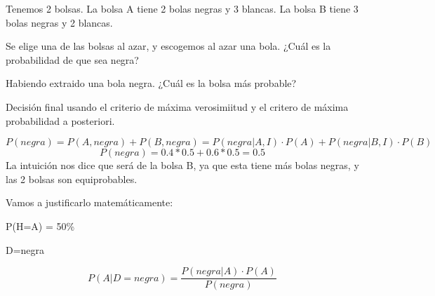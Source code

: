 \begin{problem}[4]
Tenemos 2 bolsas. La bolsa A tiene 2 bolas negras y 3 blancas. La bolsa B tiene 3 bolas negras y 2 blancas.

\ppart Se elige una de las bolsas al azar, y escogemos al azar una bola. ¿Cuál es la probabilidad de que sea negra?

\ppart Habiendo extraido una bola negra. ¿Cuál es la bolsa más probable?

\ppart Decisión final usando el criterio de máxima verosimiitud y el critero de máxima probabilidad a posteriori.

\solution

\spart 
\[
P(negra) = P(A,negra) + P(B,negra) = P(negra|A,I)·P(A) + P(negra|B,I)·P(B)\]
\[
P(negra) = 0.4*0.5+0.6*0.5 = 0.5
\]
\spart La intuición nos dice que será de la bolsa B, ya que esta tiene más bolas negras, y las 2 bolsas son equiprobables.

Vamos a justificarlo matemáticamente:

P(H=A) = 50\%

D=negra

\[
P(A|D=negra) = \frac{P(negra|A)·P(A)}{P(negra)}
\]




\end{problem}

